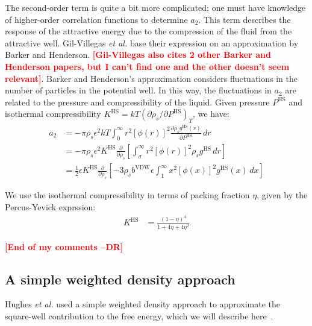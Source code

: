 \documentclass[letterpaper,twocolumn,amsmath,amssymb,pre,aps,10pt]{revtex4-1}
\newcommand\fixme[1]{\textcolor{red}{\textbf{[#1]}}}
\begin{document}
The second-order term is quite a bit more complicated; one must have
knowledge of higher-order correlation functions to determine
$a_2$. This term describes the response of the attractive energy due
to the compression of the fluid from the attractive well. Gil-Villegas
\emph{et al.} base their expression on an approximation by Barker and
Henderson\cite{barker1967-SW-perturbation}. \fixme{Gil-Villegas also
  cites 2 other Barker and Henderson papers, but I can't find one and
  the other doesn't seem relevant}. Barker and Henderson's
approximation considers fluctuations in the number of particles in the
potential well. In this way, the fluctuations in $a_2$ are related to the pressure and compressibility
of the liquid. Given pressure $P^\text{HS}$ and isothermal compressibility $K^\text{HS} = kT\left(\partial\rho_s/\partial P^\text{HS}\right)_T$, we have:
\begin{align}
  a_2 &= -\pi\rho_s\epsilon^2kT\int_0^\infty r^2\left[\phi(r)\right]^2\frac{\partial\rho_s g^\text{HS}(r)}{\partial P^\text{HS}}\,dr \\
  &= -\pi\rho_s\epsilon^2K^\text{HS}\frac{\partial}{\partial\rho_s}\left[\int_\sigma^\infty r^2\left[\phi(r)\right]^2\rho_s g^\text{HS}\,dr\right] \\
  &= \frac{1}{2}\epsilon K^\text{HS}\frac{\partial}{\partial\rho_s}\left[-3\rho_sb^\text{VDW}\epsilon\int_1^\infty x^2\left[\phi(x)\right]^2 g^\text{HS}(x)\,dx \right]
\end{align}

We use the isothermal compressibility in terms of packing fraction $\eta$, given by the Percus-Yevick exprssion\cite{barker1976liquid}:
\begin{align}
  K^\text{HS} &= \frac{\left(1 - \eta\right)^4}{1 + 4\eta + 4\eta^2}
\end{align}

\fixme{End of my comments --DR}

\subsection{A simple weighted density approach}

Hughes \emph{et al.} used a simple weighted density approach to
approximate the square-well contribution to the free energy, which we
will describe here~\cite{hughes2013classical}.
\end{document}
